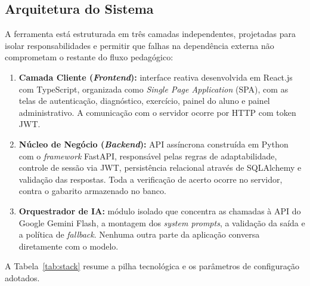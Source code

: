 \documentclass[10pt, a4paper, twocolumn]{article}
\begin{document}
\subsection{Arquitetura do Sistema}
\label{subsec:arquitetura}

A ferramenta está estruturada em três camadas independentes, projetadas para
isolar responsabilidades e permitir que falhas na dependência externa não
comprometam o restante do fluxo pedagógico:

\begin{enumerate}[leftmargin=0.4cm, itemsep=3pt]
    \item \textbf{Camada Cliente (\textit{Frontend}):} interface reativa
    desenvolvida em React.js com TypeScript, organizada como \textit{Single Page
    Application} (SPA), com as telas de autenticação, diagnóstico, exercício,
    painel do aluno e painel administrativo. A comunicação com o servidor ocorre
    por HTTP com token JWT.

    \item \textbf{Núcleo de Negócio (\textit{Backend}):} API assíncrona
    construída em Python com o \textit{framework} FastAPI, responsável pelas
    regras de adaptabilidade, controle de sessão via JWT, persistência
    relacional através de SQLAlchemy e validação das respostas. Toda a
    verificação de acerto ocorre no servidor, contra o gabarito armazenado no
    banco.

    \item \textbf{Orquestrador de IA:} módulo isolado que concentra as chamadas à
    API do Google Gemini Flash, a montagem dos \textit{system prompts}, a
    validação da saída e a política de \textit{fallback}. Nenhuma outra parte da
    aplicação conversa diretamente com o modelo.
\end{enumerate}

A Tabela~\ref{tab:stack} resume a pilha tecnológica e os parâmetros de
configuração adotados.
\end{document}
